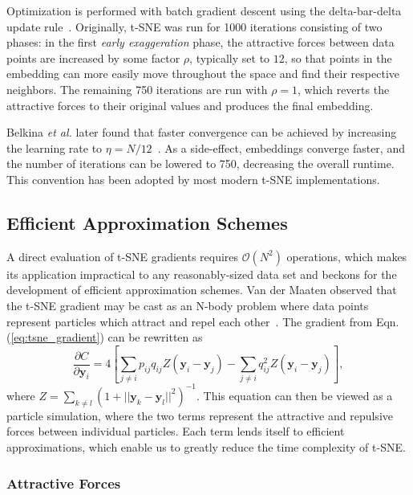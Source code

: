 \documentclass[letter]{article}
\begin{document}
Optimization is performed with batch gradient descent using the delta-bar-delta
update rule~\cite{jacobs1988increased}. Originally, t-SNE was run for 1000
iterations consisting of two phases: in the first \textit{early exaggeration}
phase, the attractive forces between data points are increased by some factor
$\rho$, typically set to $12$, so that points in the embedding can more easily
move throughout the space and find their respective neighbors. The remaining 750
iterations are run with $\rho=1$, which reverts the attractive forces to their
original values and produces the final embedding.

Belkina \textit{et al.} later found that faster convergence can be achieved by
increasing the learning rate to $\eta=N/12$~\cite{belkina2019automated}. As a
side-effect, embeddings converge faster, and the number of iterations can be
lowered to 750, decreasing the overall runtime.  This convention has been
adopted by most modern t-SNE implementations.

\subsection*{Efficient Approximation Schemes} A direct evaluation of t-SNE
gradients requires $\mathcal{O}(N^2)$ operations, which makes its application
impractical to any reasonably-sized data set and beckons for the development of
efficient approximation schemes. Van der Maaten observed that the t-SNE gradient
may be cast as an N-body problem where data points represent particles which
attract and repel each other~\cite{van2014accelerating}. The gradient from Eqn.
(\ref{eq:tsne_gradient}) can be rewritten as
\begin{equation}
\frac{\partial C}{\partial \mathbf{y}_i} = 4 \left [ \sum_{j \neq i} p_{ij} q_{ij} Z \left ( \mathbf{y}_i - \mathbf{y}_j \right ) -\sum_{j \neq i} q_{ij}^2 Z \left ( \mathbf{y}_i - \mathbf{y}_j \right ) \right ], \label{eq:grad_attr_rep}
\end{equation}
where $Z = \sum_{k \neq l}\left ( 1 + || \mathbf{y}_k - \mathbf{y}_l ||^2 \right
)^{-1}$. This equation can then be viewed as a particle simulation, where the
two terms represent the attractive and repulsive forces between individual
particles. Each term lends itself to efficient approximations, which enable us
to greatly reduce the time complexity of t-SNE.

\subsubsection*{Attractive Forces}
\end{document}

